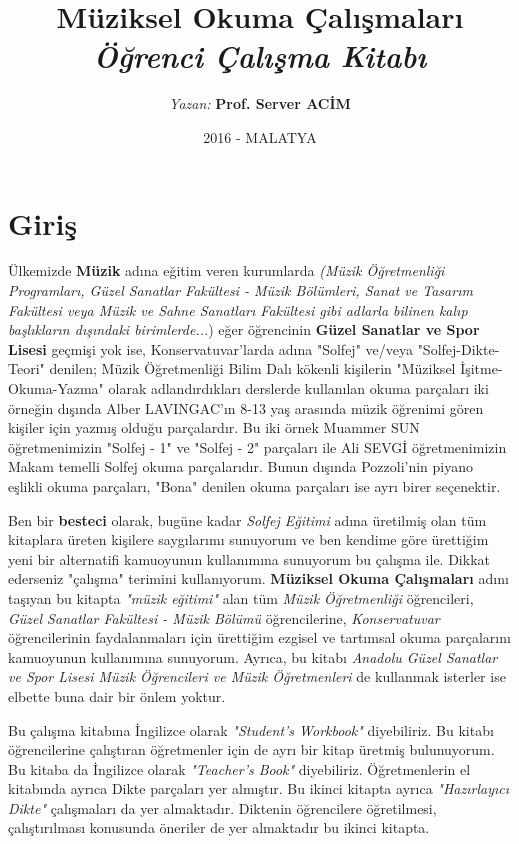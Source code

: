\documentclass[a4paper,12pt]{book}
\title{\textbf{{\huge Müziksel Okuma Çalışmaları}}  \\ \textit{{\Large Öğrenci Çalışma Kitabı}} }
\author{\textit{Yazan:} \textbf{Prof. Server ACİM}}
\date{2016 - MALATYA}
\begin{document}
\maketitle
\tableofcontents


\chapter{Giriş}
Ülkemizde \textbf{Müzik} adına eğitim veren kurumlarda \textit{(Müzik Öğretmenliği Programları, Güzel Sanatlar Fakültesi - Müzik Bölümleri, Sanat ve Tasarım Fakültesi veya Müzik ve Sahne Sanatları Fakültesi gibi adlarla bilinen kalıp başlıkların dışındaki birimlerde...}) eğer öğrencinin \textbf{Güzel Sanatlar ve Spor Lisesi} geçmişi yok ise, Konservatuvar'larda adına "Solfej" ve/veya "Solfej-Dikte-Teori" denilen; Müzik Öğretmenliği Bilim Dalı kökenli kişilerin "Müziksel İşitme-Okuma-Yazma" olarak adlandırdıkları derslerde kullanılan okuma parçaları iki örneğin dışında Alber LAVINGAC'ın 8-13 yaş arasında müzik öğrenimi gören kişiler için yazmış olduğu parçalardır. Bu iki örnek Muammer SUN öğretmenimizin "Solfej - 1" ve "Solfej - 2" parçaları ile Ali SEVGİ öğretmenimizin Makam temelli Solfej okuma parçalarıdır. Bunun dışında Pozzoli'nin piyano eşlikli okuma parçaları, "Bona" denilen okuma parçaları ise ayrı birer seçenektir.

Ben bir \textbf{besteci} olarak, bugüne kadar \textit{Solfej Eğitimi} adına üretilmiş olan tüm kitaplara üreten kişilere saygılarımı sunuyorum ve ben kendime göre ürettiğim yeni bir alternatifi kamuoyunun kullanımına sunuyorum bu çalışma ile. Dikkat ederseniz "çalışma" terimini kullanıyorum. \textbf{Müziksel Okuma Çalışmaları} adını taşıyan bu kitapta \textit{"müzik eğitimi"} alan tüm \textit{Müzik Öğretmenliği} öğrencileri, \textit{Güzel Sanatlar Fakültesi - Müzik Bölümü} öğrencilerine, \textit{Konservatuvar} öğrencilerinin faydalanmaları için ürettiğim ezgisel ve tartımsal okuma parçalarını kamuoyunun kullanımına sunuyorum. Ayrıca, bu kitabı \textit{Anadolu Güzel Sanatlar ve Spor Lisesi Müzik Öğrencileri ve Müzik Öğretmenleri} de kullanmak isterler ise elbette buna dair bir önlem yoktur.

Bu çalışma kitabına İngilizce olarak \textit{"Student's Workbook"} diyebiliriz. Bu kitabı öğrencilerine çalıştıran öğretmenler için de ayrı bir kitap üretmiş bulunuyorum. Bu kitaba da İngilizce olarak \textit{"Teacher's Book"} diyebiliriz. Öğretmenlerin el kitabında ayrıca Dikte parçaları yer almıştır. Bu ikinci kitapta ayrıca \textit{"Hazırlayıcı Dikte"} çalışmaları da yer almaktadır. Diktenin öğrencilere öğretilmesi, çalıştırılması konusunda öneriler de yer almaktadır bu ikinci kitapta.
\end{document}
